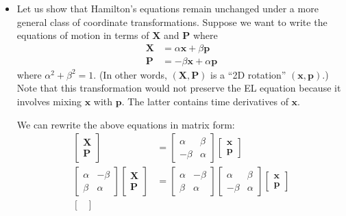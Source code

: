 \documentclass[10pt]{article}
\newcommand{\ve}[1]{\mathbf{#1}}
\begin{document}
\begin{itemize}
  	\item Let us show that Hamilton's equations remain unchanged under a more general class of coordinate transformations. Suppose we want to write the equations of motion in terms of $\ve{X}$ and $\ve{P}$ where
  	\begin{align*}
  		\ve{X} &= \alpha \ve{x} + \beta \ve{p} \\
  		\ve{P} &= -\beta \ve{x} + \alpha \ve{p}
  	\end{align*}
  	where $\alpha^2 + \beta^2 = 1$. (In other words, $(\ve{X},\ve{P})$ is a ``2D rotation'' $(\ve{x}, \ve{p})$.) Note that this transformation would not preserve the EL equation because it involves mixing $\ve{x}$ with $\ve{p}$. The latter contains time derivatives of $\ve{x}$.

  	We can rewrite the above equations in matrix form:
  	\begin{align*}
  		\begin{bmatrix}
  			\ve{X} \\
  			\ve{P}
  		\end{bmatrix}
  		&= \begin{bmatrix}
  			\alpha & \beta \\
  			-\beta & \alpha
  		\end{bmatrix}
  		\begin{bmatrix}
  			\ve{x} \\
  			\ve{p}
  		\end{bmatrix} \\
  		\begin{bmatrix}
  			\alpha & -\beta \\
  			\beta & \alpha
  		\end{bmatrix}
  		\begin{bmatrix}
  			\ve{X} \\
  			\ve{P}
  		\end{bmatrix}
  		&= 
  		\begin{bmatrix}
  			\alpha & -\beta \\
  			\beta & \alpha
  		\end{bmatrix}
  		\begin{bmatrix}
  			\alpha & \beta \\
  			-\beta & \alpha
  		\end{bmatrix}
  		\begin{bmatrix}
  			\ve{x} \\
  			\ve{p}
  		\end{bmatrix} \\
  		\begin{bmatrix}

\end{bmatrix}
\end{align*}
\end{itemize}
\end{document}
